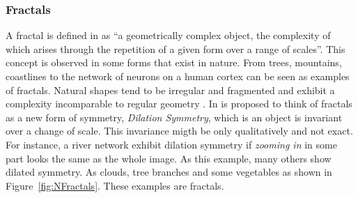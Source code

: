 
\subsubsection{Fractals} %
\label{ssub:fractals}


A fractal is defined in \cite{Ebert2002} as ``a geometrically complex object, the complexity of which arises through the repetition of a given form over a range of scales''.
This concept is observed in some forms that exist in nature. From trees, mountains, coastlines to the network of neurons on a human cortex can be seen as examples of fractals. Natural shapes tend to be irregular and fragmented and exhibit a complexity incomparable to regular geometry \cite{mandelbrot1984fractal}.
In \cite{Ebert2002} is proposed to think of fractals as a new form of symmetry, \emph{Dilation Symmetry}, which is an object is invariant over a change of scale. This invariance migth be only qualitatively and not exact. For instance, a river network exhibit dilation symmetry if \textit{zooming in} in some part looks the same as the whole image. As this example, many others show dilated symmetry. As clouds, tree branches and some vegetables as shown in Figure~\ref{fig:NFractals}. These examples are fractals.

